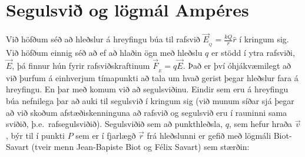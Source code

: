 
\chapter{Segulsvið og lögmál Ampéres}

Við höfðum séð að hleðslur á hreyfingu búa til rafsvið $\Vec{E}_{\!_Q} = \frac{kQ}{r}\hat{r}$ í kringum sig. Við höfðum einnig séð að ef að hlaðin ögn með hleðslu $q$ er stödd í ytra rafsviði, $\Vec{E}$, þá finnur hún fyrir rafsviðskraftinum $\Vec{F}_{\!_E} = q\Vec{E}$. Það er því óhjákvæmilegt að við þurfum á einhverjum tímapunkti að tala um hvað gerist þegar hleðslur fara á hreyfingu. En þar með komum við að segulsviðinu. Eindir sem eru á hreyfingu búa nefnilega þar að auki til segulsvið í kringum sig (við munum síðar sjá þegar að við skoðum afstæðiskenninguna að rafsvið og segulsvið eru í rauninni sama sviðið, þ.e.~rafsegulsviðið). Segulsviðið sem að punkthleðsla, $q$, sem hefur hraða $\Vec{v}$, býr til í punkti $P$ sem er í fjarlægð $\Vec{r}$ frá hleðslunni er gefið með lögmáli Biot-Savart (tveir menn Jean-Bapiste Biot og Félix Savart) sem stærðin:

